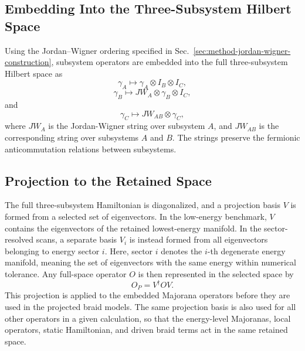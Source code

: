 \subsection{Embedding Into the Three-Subsystem Hilbert Space}
Using the Jordan--Wigner ordering specified in Sec.~\ref{sec:method-jordan-wigner-construction}, subsystem operators are embedded into the full three-subsystem Hilbert space as
\begin{equation}
\gamma_A \mapsto \gamma_A\otimes I_B\otimes I_C,
\end{equation}
\begin{equation}
\gamma_B \mapsto JW_A\otimes \gamma_B\otimes I_C,
\end{equation}
and
\begin{equation}
\gamma_C \mapsto JW_{AB}\otimes \gamma_C,
\end{equation}
where $JW_A$ is the Jordan-Wigner string over subsystem $A$, and $JW_{AB}$ is the corresponding string over subsystems $A$ and $B$. The strings preserve the fermionic anticommutation relations between subsystems.

\subsection{Projection to the Retained Space}
The full three-subsystem Hamiltonian is diagonalized, and a projection basis $V$ is formed from a selected set of eigenvectors. In the low-energy benchmark, $V$ contains the eigenvectors of the retained lowest-energy manifold. In the sector-resolved scans, a separate basis $V_i$ is instead formed from all eigenvectors belonging to energy sector $i$. Here, sector $i$ denotes the $i$-th degenerate energy manifold, meaning the set of eigenvectors with the same energy within numerical tolerance. Any full-space operator $O$ is then represented in the selected space by
\begin{equation}
O_P = V^\dagger O V .
\label{eq:method_operator_projection}
\end{equation}
This projection is applied to the embedded Majorana operators before they are used in the projected braid models. The same projection basis is also used for all other operators in a given calculation, so that the energy-level Majoranas, local operators, static Hamiltonian, and driven braid terms act in the same retained space.


